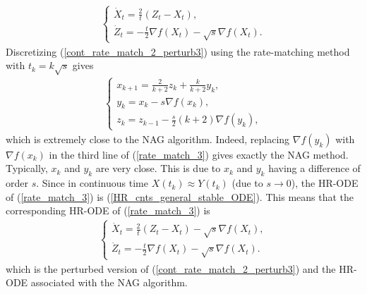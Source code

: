\documentclass{article}
\theoremstyle{plain}
\theoremstyle{definition}
\theoremstyle{remark}
\begin{document}
\begin{align}\label{cont_rate_match_2_perturb3}
    \left\{\begin{array}{l}
         \dot X_t = \frac{2}{t}(Z_t-X_t),  \\
          \dot Z_t = -\frac{t}{2}\nabla f(X_t)-\sqrt{s}\nabla f(X_t).
    \end{array}
    \right.
\end{align}
Discretizing (\ref{cont_rate_match_2_perturb3}) using the rate-matching method with \(t_k=k\sqrt{s}\) gives
\begin{align}\label{rate_match_3}
    \left\{\begin{array}{l}
    x_{k+1}=\frac{2}{k+2}z_k+\frac{k}{k+2}y_k,\\
    y_{k}=x_k-s\nabla f(x_k),   \\
    z_{k}=z_{k-1} -\frac{s}{2} (k+2)\nabla f(y_{k})  ,
    \end{array}\right.
\end{align}
which is extremely close to the NAG algorithm. Indeed, replacing \(\nabla f(y_k)\) with \(\nabla f(x_k)\) in the third line of (\ref{rate_match_3}) gives exactly the NAG method. Typically, \(x_k\) and \(y_k\) are very close. This is due to \(x_k\) and \(y_k\) having a difference of order \(s\). Since in continuous time \(X(t_k)\approx Y(t_k)\) (due to \(s\rightarrow 0\)), the HR-ODE of (\ref{rate_match_3}) is (\ref{HR_cnts_general_stable_ODE}). This means that the corresponding HR-ODE of (\ref{rate_match_3}) is 
\begin{align}\label{cont_rate_match_2_perturb4}
    \left\{\begin{array}{l}
         \dot X_t = \frac{2}{t}(Z_t-X_t)-\sqrt{s}\nabla f(X_t),  \\
          \dot Z_t = -\frac{t}{2}\nabla f(X_t)-\sqrt{s}\nabla f(X_t).
    \end{array}
    \right.
\end{align}
which is the perturbed version of (\ref{cont_rate_match_2_perturb3}) and the HR-ODE associated with the NAG algorithm.
\end{document}
